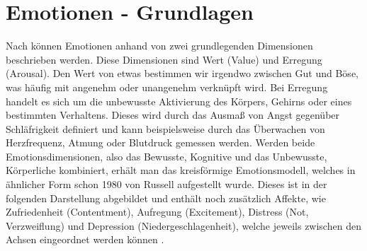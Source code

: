 \documentclass[./dokumentation.tex]{subfiles}
\begin{document}
\section{Emotionen - Grundlagen}

Nach  \cite{vanGorp2013} können Emotionen anhand von zwei grundlegenden Dimensionen beschrieben werden. Diese Dimensionen sind Wert (Value) und Erregung (Arousal). Den Wert von etwas bestimmen wir irgendwo zwischen Gut und Böse, was häufig mit angenehm oder unangenehm verknüpft wird. Bei Erregung handelt es sich um die unbewusste Aktivierung des Körpers, Gehirns oder eines bestimmten Verhaltens. Dieses wird durch das Ausmaß von Angst gegenüber Schläfrigkeit definiert und kann beispielsweise durch das Überwachen von Herzfrequenz, Atmung oder Blutdruck gemessen werden. Werden beide Emotionsdimensionen, also das Bewusste, Kognitive und das Unbewusste, Körperliche kombiniert, erhält man das kreisförmige Emotionsmodell, welches in ähnlicher Form schon 1980 von Russell aufgestellt wurde. Dieses ist in der folgenden Darstellung abgebildet und enthält noch zusätzlich Affekte, wie Zufriedenheit (Contentment), Aufregung (Excitement), Distress (Not, Verzweiflung) und Depression (Niedergeschlagenheit), welche jeweils zwischen den Achsen eingeordnet werden können  \cite{Russell1980}. 
\end{document}
